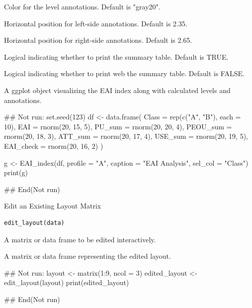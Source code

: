 \documentclass[a4paper]{book}
\begin{document}
\begin{Arguments}
\begin{ldescription}
\item[\code{color\_label}] Color for the level annotations. Default is "gray20".

\item[\code{lpos}] Horizontal position for left-side annotations. Default is 2.35.

\item[\code{rpos}] Horizontal position for right-side annotations. Default is 2.65.

\item[\code{print}] Logical indicating whether to print the summary table. Default is TRUE.

\item[\code{web}] Logical indicating whether to print web the summary table. Default is FALSE.
\end{ldescription}
\end{Arguments}
%
\begin{Value}
A ggplot object visualizing the EAI index along with calculated levels and annotations.
\end{Value}
%
\begin{Examples}
\begin{ExampleCode}
\#\# Not run: 
set.seed(123)
df <- data.frame(
  Class = rep(c("A", "B"), each = 10),
  EAI = rnorm(20, 15, 5),
  PU_sum = rnorm(20, 20, 4),
  PEOU_sum = rnorm(20, 18, 3),
  ATT_sum = rnorm(20, 17, 4),
  USE_sum = rnorm(20, 19, 5),
  EAI_check = rnorm(20, 16, 2)
)

g <- EAI_index(df, profile = "A", caption = "EAI Analysis", sel_col = "Class")
print(g)

## End(Not run)
\end{ExampleCode}
\end{Examples}

%
\begin{Description}
Edit an Existing Layout Matrix
\end{Description}
%
\begin{Usage}
\begin{verbatim}
edit_layout(data)
\end{verbatim}
\end{Usage}
%
\begin{Arguments}
\begin{ldescription}
\item[\code{data}] A matrix or data frame to be edited interactively.
\end{ldescription}
\end{Arguments}
%
\begin{Value}
A matrix or data frame representing the edited layout.
\end{Value}
%
\begin{Examples}
\begin{ExampleCode}
\#\# Not run: 
layout <- matrix(1:9, ncol = 3)
edited_layout <- edit_layout(layout)
print(edited_layout)

## End(Not run)
\end{ExampleCode}
\end{Examples}
\end{document}
